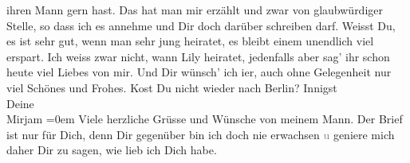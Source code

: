 \begin{ledgroupsized}[t]{13cm}
                    ihren Mann gern hast. Das
                    hat man mir erzählt und zwar von glaubwürdiger Stelle, so dass ich es annehme
                    und Dir doch darüber schreiben darf. Weisst Du, es ist sehr gut, wenn man sehr
                    jung heiratet, es bleibt einem unendlich viel erspart. Ich weiss zwar nicht,
                    wann Lily heiratet, jedenfalls {\pb}aber sag’ ihr schon heute
                    viel Liebes von mir. Und Dir wünsch’ ich i{\geminationm}er, auch
                    ohne Gelegenheit nur viel Schönes und Frohes.\pend
           \pstart
           Ko{\geminationm}st Du nicht wieder nach Berlin?\pend
           \pstart
           Innigst{\\[\baselineskip]}Deine{\\[\baselineskip]}\spacefill\mbox{Mirjam}\pend
           \leftskip=0em{}\pstart
           \noindent{}Viele herzliche Grüsse und Wünsche von meinem Mann.\pend
           \pstart
           Der Brief ist nur für Dich, denn Dir gegenüber bin ich doch nie erwachsen \textcolor{gray}{u}
                        geniere mich daher Dir zu sagen, wie lieb ich Dich habe.\pend
           \endnumbering{}\end{ledgroupsized}  \newcommand{\dateiname}{L02488}\newcommand{\titel}{Mirjam Beer-Hofmann an Arthur Schnitzler, 8. 6. 1927}\newcommand{\editorInnen}{Martin Anton Müller und Gerd-Hermann Susen}
      